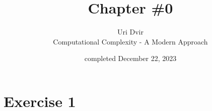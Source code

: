 \documentclass[12pt]{article}
\title{Chapter \#0}
\author{Uri Dvir \\ Computational Complexity - A Modern Approach}
\date{completed December 22, 2023}
\begin{document}
\maketitle

\section*{Exercise 1}
\end{document}

